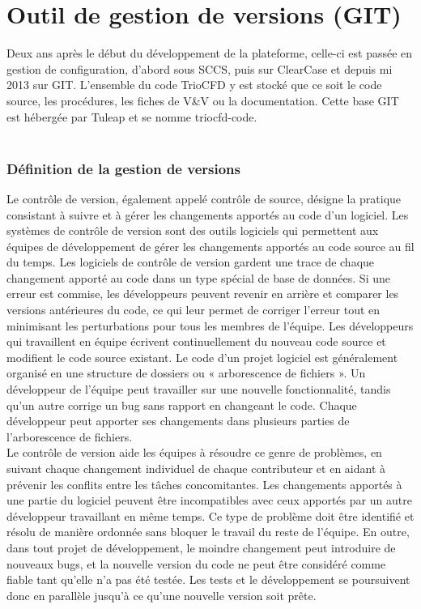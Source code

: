 \chapter{\label{chapitre:GIT}Outil de gestion de versions (GIT)}
Deux ans après le début du développement de la plateforme, celle-ci est passée en gestion de configuration, d'abord sous SCCS, puis sur ClearCase et depuis mi 2013 sur GIT. L'ensemble du code TrioCFD y est stocké que ce soit le code source, les procédures, les fiches de V\&V ou la documentation. Cette base GIT est hébergée par Tuleap et se nomme triocfd-code.\\
\\
\subsection{Définition de la gestion de versions}
Le contrôle de version, également appelé contrôle de source, désigne la pratique consistant à suivre et à gérer les changements apportés au code d'un logiciel. Les systèmes de contrôle de version sont des outils logiciels qui permettent aux équipes de développement de gérer les changements apportés au code source au fil du temps. Les logiciels de contrôle de version gardent une trace de chaque changement apporté au code dans un type spécial de base de données. Si une erreur est commise, les développeurs peuvent revenir en arrière et comparer les versions antérieures du code, ce qui leur permet de corriger l'erreur tout en minimisant les perturbations pour tous les membres de l'équipe. 
Les développeurs qui travaillent en équipe écrivent continuellement du nouveau code source et modifient le code source existant. Le code d'un projet logiciel est généralement organisé en une structure de dossiers ou « arborescence de fichiers ». Un développeur de l'équipe peut travailler sur une nouvelle fonctionnalité, tandis qu'un autre corrige un bug sans rapport en changeant le code. Chaque développeur peut apporter ses changements dans plusieurs parties de l'arborescence de fichiers.\\
Le contrôle de version aide les équipes à résoudre ce genre de problèmes, en suivant chaque changement individuel de chaque contributeur et en aidant à prévenir les conflits entre les tâches concomitantes. Les changements apportés à une partie du logiciel peuvent être incompatibles avec ceux apportés par un autre développeur travaillant en même temps. Ce type de problème doit être identifié et résolu de manière ordonnée sans bloquer le travail du reste de l'équipe. En outre, dans tout projet de développement, le moindre changement peut introduire de nouveaux bugs, et la nouvelle version du code ne peut être considéré comme fiable tant qu'elle n'a pas été testée. Les tests et le développement se poursuivent donc en parallèle jusqu'à ce qu'une nouvelle version soit prête.\\
